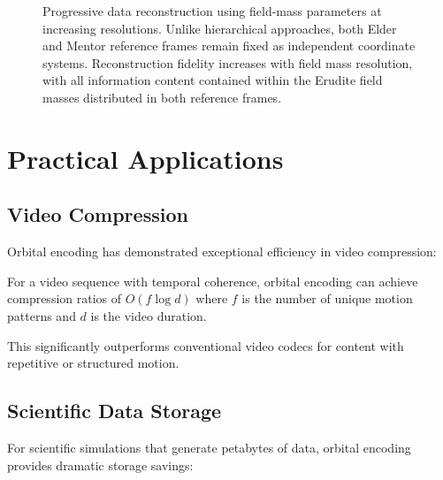 \begin{figure}[h]
\caption{Progressive data reconstruction using field-mass parameters at increasing resolutions. Unlike hierarchical approaches, both Elder and Mentor reference frames remain fixed as independent coordinate systems. Reconstruction fidelity increases with field mass resolution, with all information content contained within the Erudite field masses distributed in both reference frames.}
\label{fig:progressive_reconstruction}
\end{figure}

\section{Practical Applications}

\subsection{Video Compression}

Orbital encoding has demonstrated exceptional efficiency in video compression:

\begin{proposition}
For a video sequence with temporal coherence, orbital encoding can achieve compression ratios of $O(f \log d)$ where $f$ is the number of unique motion patterns and $d$ is the video duration.
\end{proposition}

This significantly outperforms conventional video codecs for content with repetitive or structured motion.

\subsection{Scientific Data Storage}

For scientific simulations that generate petabytes of data, orbital encoding provides dramatic storage savings:

